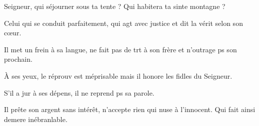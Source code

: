 \item Seigneur, qui séjourner sous ta tente ?\psstar{} Qui habitera ta sinte montagne ?
\item Celui qui se conduit parfaitement,\pscross{} qui agt avec justice\psstar{} et dit la vérit selon son cœur.
\item Il met un frein à sa langue,\pscross{} ne fait pas de trt à son frère\psstar{} et n’outrage ps son prochain.
\item À ses yeux, le réprouv est méprisable\psstar{} mais il honore les fidles du Seigneur.
\item S’il a jur à ses dépens,\psstar{} il ne reprend ps sa parole.
\item Il prête son argent sans intérêt,\pscross{} n’accepte rien qui nuse à l’innocent.\psstar{} Qui fait ainsi demere inébranlable.